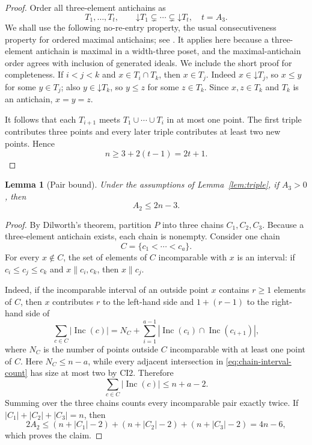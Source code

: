 \documentclass[11pt]{article}
\numberwithin{equation}{section}
\newtheorem{lemma}[theorem]{Lemma}
\theoremstyle{definition}
\theoremstyle{remark}
\newcommand{\Inc}{\operatorname{Inc}}
\newcommand{\down}{\mathord{\downarrow}}
\begin{document}
\begin{proof}
Order all three-element antichains as
\[
        T_1,\ldots,T_t,\qquad
        \down T_1\subsetneq\cdots\subsetneq\down T_t,
        \quad t=A_3.
\]
We shall use the following no-re-entry property, the usual consecutiveness
property for ordered maximal antichains; see
\cite[Proposition~2.4 in the preprint version]{DusartHC2024}.
It applies here because a three-element antichain is maximal in a
width-three poset, and the maximal-antichain order agrees with inclusion
of generated ideals.  We include the short proof for completeness.
If $i<j<k$ and $x\in T_i\cap T_k$, then
$x\in T_j$.  Indeed $x\in\down T_j$, so $x\le y$ for some $y\in T_j$;
also $y\in\down T_k$, so $y\le z$ for some $z\in T_k$.  Since
$x,z\in T_k$ and $T_k$ is an antichain, $x=y=z$.

It follows that each $T_{i+1}$ meets
$T_1\cup\cdots\cup T_i$ in at most one point.  The first triple contributes
three points and every later triple contributes at least two new points.
Hence
\[
        n\ge 3+2(t-1)=2t+1.
\]
\end{proof}

\begin{lemma}[Pair bound]\label{lem:pairs}
Under the assumptions of Lemma~\ref{lem:triple}, if $A_3>0$, then
\[
        A_2\le 2n-3.
\]
\end{lemma}

\begin{proof}
By Dilworth's theorem, partition $P$ into three chains
$C_1,C_2,C_3$.  Because a three-element antichain exists, each chain is
nonempty.  Consider one chain
\[
        C=\{c_1<\cdots<c_a\}.
\]
For every $x\notin C$, the set of elements of $C$ incomparable with $x$
is an interval: if $c_i\le c_j\le c_k$ and $x\parallel c_i,c_k$, then
$x\parallel c_j$.

Indeed, if the incomparable interval of an outside point $x$ contains
$r\ge1$ elements of $C$, then $x$ contributes $r$ to the left-hand side
and $1+(r-1)$ to the right-hand side of
\begin{equation}\label{eq:chain-interval-count}
\sum_{c\in C}|\Inc(c)|
 =
 N_C+\sum_{i=1}^{a-1}
 |\Inc(c_i)\cap\Inc(c_{i+1})|,
\end{equation}
where $N_C$ is the number of points outside $C$ incomparable with at least
one point of $C$.  Here $N_C\le n-a$, while every adjacent intersection
in \eqref{eq:chain-interval-count} has size at most two by $\mathrm{CI2}$.  Therefore
\[
        \sum_{c\in C}|\Inc(c)|\le n+a-2.
\]
Summing over the three chains counts every incomparable pair exactly twice.
If $|C_1|+|C_2|+|C_3|=n$, then
\[
        2A_2\le (n+|C_1|-2)+(n+|C_2|-2)+(n+|C_3|-2)
        =4n-6,
\]
which proves the claim.
\end{proof}
\end{document}
